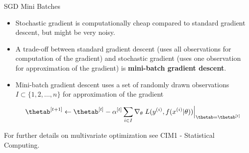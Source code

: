 \begin{vbframe}{SGD Mini Batches}

\begin{itemize}
  \item Stochastic gradient is computationally cheap compared to standard gradient descent, but might be very noisy.
\item A trade-off between standard gradient descent (uses all observations for computation of the gradient) and stochastic gradient (uses one observation for approximation of the gradient) is \textbf{mini-batch gradient descent}.
\item Mini-batch gradient descent uses a set of randomly drawn observations $I \subset \{1, 2, ..., n\}$ for approximation of the gradient 

 \begin{eqnarray*}
\thetab^{[t+1]} \leftarrow \thetab^{[t]} - \alpha^{[t]} \sum_{i \in I} \nabla_{\theta} \left. \Lxyit \right|_{\thetab = \thetab^{[t]}}
\end{eqnarray*}

\end{itemize}

For further details on multivariate optimization see CIM1 - Statistical
Computing.
\end{vbframe}

\endlecture



